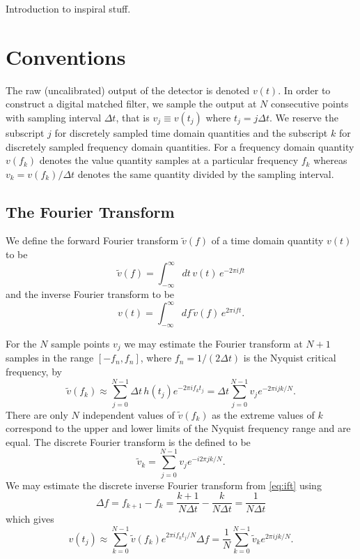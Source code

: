 
Introduction to inspiral stuff.

\section*{Conventions}
\label{s:conventions}

The raw (uncalibrated) output of the detector is denoted $v(t)$. In order to
construct a digital matched filter, we sample the output at $N$ consecutive
points with sampling interval $\Delta t$, that is $v_j \equiv v(t_j)$ where
$t_j = j\Delta t$. We reserve the subscript $j$ for discretely sampled time
domain quantities and the subscript $k$ for discretely sampled frequency
domain quantities. For a frequency domain quantity $v(f_k)$ denotes the
value quantity samples at a particular frequency $f_k$ whereas $v_k = v(f_k)
/ \Delta t$ denotes the same quantity divided by the sampling interval.

\subsection*{The Fourier Transform}
\label{ss:ftconv}

We define the forward Fourier transform $\tilde{v}(f)$ of a time domain
quantity $v(t)$ to be
\begin{equation}
\label{eq:ft}
\tilde{v}(f)=\int_{-\infty}^\infty dt\,v(t)\, e^{- 2 \pi i f t}
\end{equation}
and the inverse Fourier transform to be 
\begin{equation}
\label{eq:ift}
v(t)=\int_{-\infty}^\infty df\,\tilde{v}(f)\, e^{2 \pi i f t}.
\end{equation}

For the $N$ sample points $v_j$ we may estimate the Fourier transform at 
$N + 1$ samples in the range $[-f_n,f_n]$, where $f_n = 1/(2\Delta t)$ is the
Nyquist critical frequency, by
\begin{equation}
\tilde{v}(f_k) \approx \sum_{j=0}^{N-1} \Delta t\, h(t_j) e^{-2 \pi i f_k t_j}
= \Delta t \sum_{j=0}^{N-1} v_j e^{-2 \pi i j k / N}.
\end{equation}
There are only $N$ independent values of $\tilde{v}(f_k)$ as the extreme
values of $k$ correspond to the upper and lower limits of the Nyquist
frequency range and are equal. The discrete Fourier transform is the defined
to be\cite{T010095}
\begin{equation}
\tilde{v}_k = \sum_{j=0}^{N-1} v_j e^{-i 2 \pi j k / N}.
\end{equation}
We may estimate the discrete inverse Fourier transform from \ref{eq:ift} using
\begin{equation}
\Delta f = f_{k+1} - f_k = \frac{k+1}{N\Delta t} - \frac{k}{N\Delta t} =
\frac{1}{N\Delta t}
\end{equation}
which gives
\begin{equation}
v(t_j) \approx \sum_{k=0}^{N-1} \tilde{v}(f_k) e^{2 \pi i f_k t_j / N} \Delta f
= \frac{1}{N} \sum_{k=0}^{N-1} \tilde{v}_k e^{2 \pi i j k / N}.
\end{equation}

